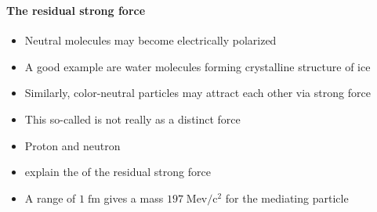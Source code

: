 \begin{frame}
\frametitle{\texorpdfstring{\culine[\sectiontitleulinecolor]{\sectiontitle}}{\sectiontitle} }
\framesubtitle{The residual strong force}

\begin{itemize}[itemsep=2.2mm]
	\item Neutral molecules may become electrically polarized 
	\item A good example are water molecules forming crystalline structure of ice 
	\item Similarly, color-neutral particles may attract each other via strong force 
	
\item This so-called  is not really as a distinct force

\item Proton and neutron   
\item {} explain the  of the residual strong force
\item A range of $1 \mathrm{\;fm}$ gives a mass $197 \mathrm{\;Mev} / \mathrm{c}^{2}$ for the mediating particle
\end{itemize}

\endofslide 
\end{frame}

